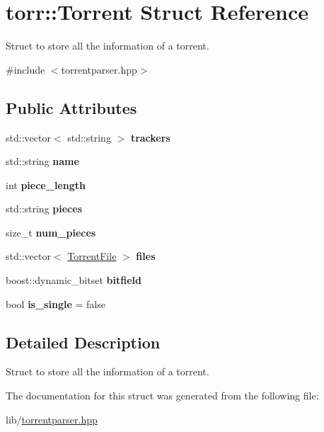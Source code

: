 \hypertarget{structtorr_1_1Torrent}{}\section{torr\+:\+:Torrent Struct Reference}
\label{structtorr_1_1Torrent}


Struct to store all the information of a torrent.  




{\ttfamily \#include $<$torrentparser.\+hpp$>$}

\subsection*{Public Attributes}
\begin{DoxyCompactItemize}
\item 
\mbox{\label{structtorr_1_1Torrent_aa3530ebe8cd480eb46d181058781f777}} 
std\+::vector$<$ std\+::string $>$ {\bfseries trackers}
\item 
\mbox{\label{structtorr_1_1Torrent_a70ddba7d4d556249af363951bdfe9db5}} 
std\+::string {\bfseries name}
\item 
\mbox{\label{structtorr_1_1Torrent_a14a9e2c34bebdbf554444a7aa38ffd5f}} 
int {\bfseries piece\+\_\+length}
\item 
\mbox{\label{structtorr_1_1Torrent_a3afdf5a9a3c3b639940dd8aeb20126dc}} 
std\+::string {\bfseries pieces}
\item 
\mbox{\label{structtorr_1_1Torrent_aaec681edf1786ad847580dc8420e3628}} 
size\+\_\+t {\bfseries num\+\_\+pieces}
\item 
\mbox{\label{structtorr_1_1Torrent_addacc024662afc30af7b87ef538c59d7}} 
std\+::vector$<$ \hyperlink{structtorr_1_1TorrentFile}{Torrent\+File} $>$ {\bfseries files}
\item 
\mbox{\label{structtorr_1_1Torrent_ac6d62fe337dbd88fd6ee728615d20102}} 
boost\+::dynamic\+\_\+bitset {\bfseries bitfield}
\item 
\mbox{\label{structtorr_1_1Torrent_a4133227fdb1289fa4c345d113ae9f93e}} 
bool {\bfseries is\+\_\+single} = false
\end{DoxyCompactItemize}


\subsection{Detailed Description}
Struct to store all the information of a torrent. 

The documentation for this struct was generated from the following file\+:\begin{DoxyCompactItemize}
\item 
lib/\hyperlink{torrentparser_8hpp}{torrentparser.\+hpp}\end{DoxyCompactItemize}
